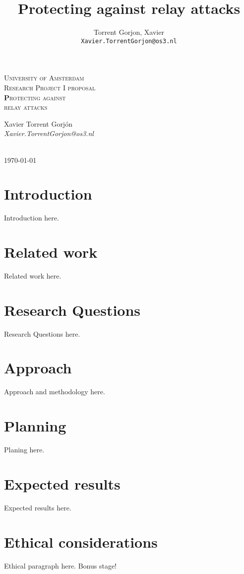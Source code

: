 \documentclass{article}
\author{
  Torrent Gorjon, Xavier\\
  \texttt{Xavier.TorrentGorjon@os3.nl}
}
\title{Protecting against relay attacks}
\begin{document}
\begin{titlepage}
\center

\textsc{\LARGE University of Amsterdam}\\[1.5cm]

\textsc{\Large Research Project I proposal}\\[0.5cm]

\textsc{\Huge \textbf Protecting against\\relay attacks}\\[1.5cm]


\begin{minipage}{0.5 \textwidth}
\begin{center} \large
Xavier Torrent Gorj\'{o}n\\
\emph{Xavier.TorrentGorjon@os3.nl}\\[0.5cm]
\end{center}
\end{minipage}\\[3cm]
{\large \today} 


\end{titlepage}


\newpage

\tableofcontents
\section{Introduction}
Introduction here.
\section{Related work}
Related work here.
\section{Research Questions}
Research Questions here.
\section{Approach}
Approach and methodology here.
\section{Planning}
Planing here.
\section{Expected results}
Expected results here.
\section{Ethical considerations}
Ethical paragraph here. Bonus stage!
\end{document}
